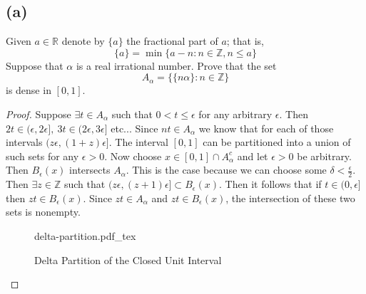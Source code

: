 \documentclass{article}
\begin{document}
    \subsection*{(a)} 
        Given $a \in \mathbb{R}$ denote by $\{a\}$ the 
        fractional part of $a$; that is,
        \[ 
            \{a\} = \min \{a-n:n\in\mathbb{Z},n\leq a\}    
        \]
        Suppose that $\alpha$ is a real irrational number. Prove that the set 
        \[
            A_\alpha = \{ \{n\alpha\} : n \in \mathbb{Z}\}
        \]
        is dense in $[0,1]$.
        \begin{proof}
            Suppose $\exists t \in A_\alpha$ such that $0 < t \leq \epsilon$ for any arbitrary $\epsilon$. Then $2t \in (\epsilon, 2\epsilon], \ 3t \in (2\epsilon, 3\epsilon]$ etc...
            Since $nt \in A_\alpha$ we know that for each of those intervals $(z\epsilon, (1+z)\epsilon]$.
            The interval $[0,1]$ can be partitioned into a union of such sets for any $\epsilon > 0$. Now choose 
            $x \in [0,1] \cap A_\alpha^c$ and let $\epsilon > 0$ be arbitrary. Then $B_\epsilon(x)$ intersects $A_\alpha$.
            This is the case because we can choose some $\delta < \frac{\epsilon}{2}$. Then $\exists z \in \mathbb{Z}$ such that 
            $(z\epsilon, (z+1)\epsilon] \subset B_\epsilon(x)$. Then it follows that if $t \in (0, \epsilon]$ then $zt \in B_\epsilon(x)$.
            Since $zt \in A_\alpha$ and $zt \in B_\epsilon(x)$, the intersection of these two sets is nonempty.
            \begin{figure}[ht]
                \centering
                \def\svgwidth{.5\linewidth}
                {delta-partition.pdf_tex}
                \caption{Delta Partition of the Closed Unit Interval}
                \label{fig:delta-partition}
            \end{figure}
        \end{proof}
\end{document}
